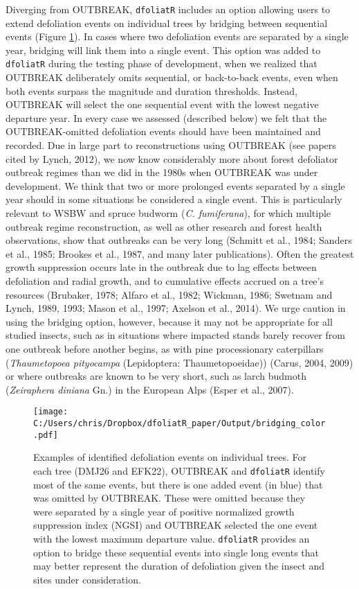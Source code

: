 \documentclass[review]{elsarticle} %
\begin{document}
Diverging from OUTBREAK, \texttt{dfoliatR} includes an option allowing users to extend defoliation events on individual trees by bridging between sequential events (Figure \ref{fig:fig-bridge}). In cases where two defoliation events are separated by a single year, bridging will link them into a single event. This option was added to \texttt{dfoliatR} during the testing phase of development, when we realized that OUTBREAK deliberately omits sequential, or back-to-back events, even when both events surpass the magnitude and duration thresholds. Instead, OUTBREAK will select the one sequential event with the lowest negative departure year. In every case we assessed (described below) we felt that the OUTBREAK-omitted defoliation events should have been maintained and recorded. Due in large part to reconstructions using OUTBREAK (see papers cited by Lynch, 2012), we now know considerably more about forest defoliator outbreak regimes than we did in the 1980s when OUTBREAK was under development. We think that two or more prolonged events separated by a single year should in some situations be considered a single event. This is particularly relevant to WSBW and spruce budworm (\emph{C. fumiferana}), for which multiple outbreak regime reconstruction, as well as other research and forest health observations, show that outbreaks can be very long (Schmitt et al., 1984; Sanders et al., 1985; Brookes et al., 1987, and many later publications). Often the greatest growth suppression occurs late in the outbreak due to lag effects between defoliation and radial growth, and to cumulative effects accrued on a tree's resources (Brubaker, 1978; Alfaro et al., 1982; Wickman, 1986; Swetnam and Lynch, 1989, 1993; Mason et al., 1997; Axelson et al., 2014). We urge caution in using the bridging option, however, because it may not be appropriate for all studied insects, such as in situations where impacted stands barely recover from one outbreak before another begins, as with pine processionary caterpillars (\emph{Thaumetopoea pityocampa} (Lepidoptera: Thaumetopoeidae)) (Carus, 2004, 2009) or where outbreaks are known to be very short, such as larch budmoth (\emph{Zeiraphera diniana} Gn.) in the European Alps (Esper et al., 2007).



\begin{figure}
\centering
\texttt{[image: C:/Users/chris/Dropbox/dfoliatR\_paper/Output/bridging\_color.pdf]}
\caption{\label{fig:fig-bridge}Examples of identified defoliation events on individual trees. For each tree (DMJ26 and EFK22), OUTBREAK and \texttt{dfoliatR} identify most of the same events, but there is one added event (in blue) that was omitted by OUTBREAK. These were omitted because they were separated by a single year of positive normalized growth suppression index (NGSI) and OUTBREAK selected the one event with the lowest maximum departure value. \texttt{dfoliatR} provides an option to bridge these sequential events into single long events that may better represent the duration of defoliation given the insect and sites under consideration.}
\end{figure}
\end{document}
